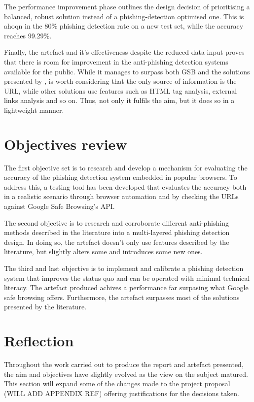 The performance improvement phase outlines the design decision of prioritising a balanced, robust solution instead of a phishing-detection optimised one. This is ahoqn in the  80\% phishing detection rate on a new test set, while the accuracy reaches 99.29\%.

Finally, the artefact and it's effectiveness despite the reduced data input proves that there is room for improvement in the anti-phishing detection systems available for the public. While it manages to surpass both GSB and the solutions presented by \cite{INTELLIGENT_PHISHING_ANFIS}, is worth considering that the only source of information is the URL, while other solutions use features such as HTML tag analysis, external links analysis and so on. Thus, not only it fulfils the aim, but it does so in a lightweight manner.

\section{Objectives review}
The first objective set is to research and develop a mechanism for evaluating the accuracy of the phishing detection system embedded in popular browsers. To address this, a testing tool has been developed that evaluates the accuracy both in a realistic scenario through browser automation and by checking the URLs against Google Safe Browsing's API.

The second objective is to research and corroborate different anti-phishing methods described in the literature into a multi-layered phishing detection design. In doing so, the artefact doesn't only use features described by the literature, but slightly alters some and introduces some new ones. 

The third and last objective is to implement and calibrate a phishing detection system that improves the status quo and can be operated with minimal technical literacy. The artefact produced achives a performance far surpasing what Google safe browsing offers. Furthermore, the artefact surpasses most of the solutions presented by the literature.

\section{Reflection}
Throughout the work carried out to produce the report and artefact presented, the aim and objectives have slightly evolved as the view on the subject matured. This section will expand some of the changes made to the project proposal (WILL ADD APPENDIX REF) offering justifications for the decisions taken.

